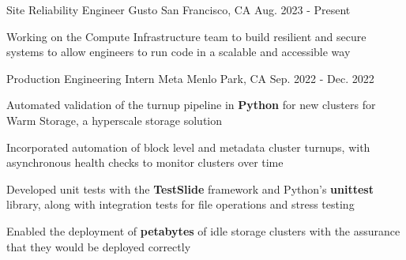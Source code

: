 

\begin{cventries}

\cventry
{Site Reliability Engineer} %
{Gusto} %
{San Francisco, CA} %
{Aug. 2023 - Present} %
{
  \begin{cvitems} %
    \item{Working on the Compute Infrastructure team to build resilient and secure systems to allow engineers to run code in a scalable and accessible way}
  \end{cvitems}
}

\cventry
{Production Engineering Intern} %
{Meta} %
{Menlo Park, CA} %
{Sep. 2022 - Dec. 2022} %
{
  \begin{cvitems} %
    \item {Automated validation of the turnup pipeline in \textbf{Python} for new clusters for Warm Storage, a hyperscale storage solution}
    \item {Incorporated automation of block level and metadata cluster turnups, with asynchronous health checks to monitor clusters over time}
    \item {Developed unit tests with the \textbf{TestSlide} framework and Python's \textbf{unittest} library, along with integration tests for file operations and stress testing}
    \item {Enabled the deployment of \textbf{petabytes} of idle storage clusters with the assurance that they would be deployed correctly}
  \end{cvitems}
}


\end{cventries}
